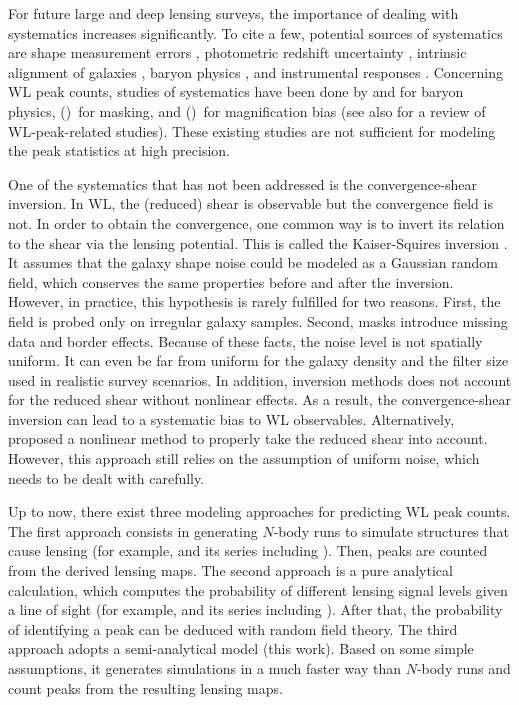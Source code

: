 \documentclass{aa} %
\newcommand{\LiuFourteenA}{\citetalias{Liu_etal_2014} (\citeyear{Liu_etal_2014})}
\newcommand{\LiuFourteenB}{\citetalias{Liu_etal_2014a} (\citeyear{Liu_etal_2014a})}
\begin{document}
For future large and deep lensing surveys, the importance of dealing with systematics increases significantly. To cite a few, potential sources of systematics are shape measurement errors \citep{Cardone_etal_2014}, photometric redshift uncertainty \citep{Cunha_etal_2014, Bonnett_2016, Choi_etal_2016, Gruen_Brimioulle_2017}, intrinsic alignment of galaxies \citep{Chisari_etal_2014, Codis_etal_2015, Schaefer_Merkel_2015, Schrabback_etal_2015, Krause_etal_2016}, baryon physics \citep{Mohammed_etal_2014, Harnois-Deraps_etal_2015}, and instrumental responses \citep{Gurvich_Mandelbaum_2016, Okura_etal_2016, Kannawadi_etal_2016, Plazas_etal_2016}. Concerning WL peak counts, studies of systematics have been done by \citet{Yang_etal_2013} and \citet{Osato_etal_2015} for baryon physics, \LiuFourteenA\ for masking, and \LiuFourteenB\ for magnification bias (see also \citealt{Lin_2016} for a review of WL-peak-related studies). These existing studies are not sufficient for modeling the peak statistics at high precision.

One of the systematics that has not been addressed is the convergence-shear inversion. In WL, the (reduced) shear is observable but the convergence field is not. In order to obtain the convergence, one common way is to invert its relation to the shear via the lensing potential. This is called the Kaiser-Squires inversion \citep{Kaiser_Squires_1993}. It assumes that the galaxy shape noise could be modeled as a Gaussian random field, which conserves the same properties before and after the inversion. However, in practice, this hypothesis is rarely fulfilled for two reasons. First, the field is probed only on irregular galaxy samples. Second, masks introduce missing data and border effects. Because of these facts, the noise level is not spatially uniform. It can even be far from uniform for the galaxy density and the filter size used in realistic survey scenarios. In addition, inversion methods does not account for the reduced shear without nonlinear effects. As a result, the convergence-shear inversion can lead to a systematic bias to WL observables. Alternatively, \citet{Seitz_Schneider_1995} proposed a nonlinear method to properly take the reduced shear into account. However, this approach still relies on the assumption of uniform noise, which needs to be dealt with carefully.

Up to now, there exist three modeling approaches for predicting WL peak counts. The first approach consists in generating $N$-body runs to simulate structures that cause lensing (for example, \citealt{Kratochvil_etal_2010} and its series including  \citeyear{Liu_etal_2015}). Then, peaks are counted from the derived lensing maps. The second approach is a pure analytical calculation, which computes the probability of different lensing signal levels given a line of sight (for example, \citealt{Fan_etal_2010} and its series including  \citeyear{Liu_etal_2015a}). After that, the probability of identifying a peak can be deduced with random field theory. The third approach adopts a semi-analytical model (this work). Based on some simple assumptions, it generates simulations in a much faster way than $N$-body runs and count peaks from the resulting lensing maps.
\end{document}
